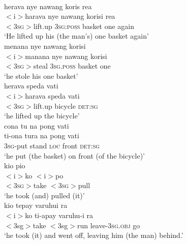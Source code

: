\ea \label{Wooi_Abra1}
\\
\ea
\glll herava nye nawang koris rea \\
$<$i$>$harava nye nawang korisi rea \\
$<$\textsc{3}\textsc{sg}$>$lift.up \textsc{3}\textsc{sg}:\textsc{poss} basket one again\\
\glft `He lifted up his (the man's) one basket again'\\
\ex
\glll menana nye nawang korisi\\
$<$i$>$manana nye nawang korisi \\
$<$\textsc{3}\textsc{sg}$>$steal \textsc{3}\textsc{sg}.\textsc{poss} basket one\\
\glft `he stole his one basket'\\
\ex
\glll herava speda vati\\
$<$i$>$harava speda vati \\
$<$\textsc{3}\textsc{sg}$>$lift.up bicycle \textsc{det}:\textsc{sg}\\
\glft `he lifted up the bicycle'\\
\ex
\glll cona tu na pong vati\\
ti-ona tura na pong vati \\
\textsc{3}\textsc{sg}-put stand \textsc{loc} front \textsc{det}:\textsc{sg}\\
\glft `he put (the basket) on front (of the bicycle)'\\
\ex
\glll kio pio\\
$<$i$>$ko $<$i$>$po \\
$<$\textsc{3}\textsc{sg}$>$take $<$\textsc{3}\textsc{sg}$>$pull\\
\glft `he took (and) pulled (it)'\\
\ex
\glll kio tepay varuhui ra\\
$<$i$>$ko ti-apay varuhu-i ra \\
$<$3sg$>$take $<$3sg$>$run leave-\textsc{3}\textsc{sg}.\textsc{obj} go\\
\glft `he took (it) and went off, leaving him (the man) behind.'\\ 
\z
\z

